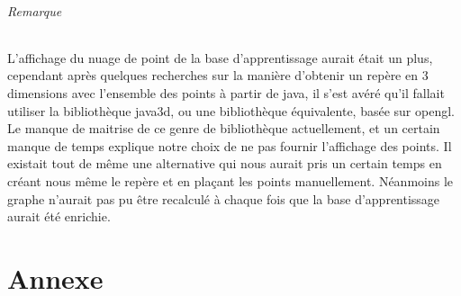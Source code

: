 \documentclass[a4paper,12pt]{report}
\begin{document}
\paragraph{Remarque\\}
L'affichage du nuage de point de la base d'apprentissage aurait était un plus, cependant après quelques recherches sur la manière d'obtenir un repère en 3 dimensions avec l'ensemble des points à partir de java, il s'est avéré qu'il fallait utiliser la bibliothèque java3d, ou une bibliothèque équivalente, basée sur opengl. Le manque de maitrise de ce genre de bibliothèque actuellement, et un certain manque de temps explique notre choix de ne pas fournir l'affichage des points. Il existait tout de même une alternative qui nous aurait pris un certain temps en créant nous même le repère et en plaçant les points manuellement. Néanmoins le graphe n'aurait pas pu être recalculé à chaque fois que la base d'apprentissage aurait été enrichie.

\part*{Annexe}
\appendix
\label{chap:Manuel}

 
\end{document}
